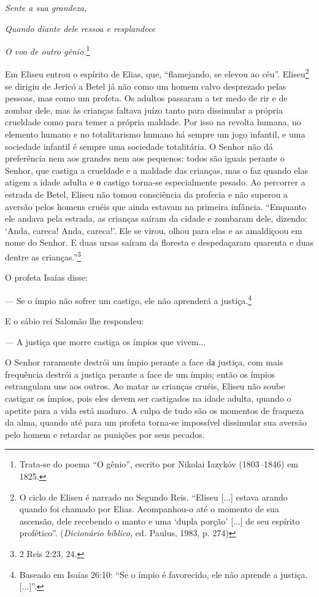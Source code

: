 \emph{Sente a sua grandeza,}

\emph{Quando diante dele ressoa e resplandece}

\emph{O voo de outro gênio.}\footnote{Trata-se do poema ``O gênio'',
  escrito por Nikolai Iazykóv (1803\emph{--}1846) em 1825.}

Em Eliseu entrou o espírito de Elias, que, ``flamejando, se elevou ao
céu''. Eliseu\footnote{O ciclo de Eliseu é narrado no Segundo Reis.
  ``Eliseu {[}...{]} estava arando quando foi chamado por Elias.
  Acompanhou-o até o momento de sua ascensão, dele recebendo o manto e
  uma `dupla porção' {[}...{]} de seu espírito profético''.
  (\emph{Dicionário bíblico,} ed\emph{.} Paulus, 1983, p. 274)} se
dirigiu de Jericó a Betel já não como um homem calvo desprezado pelas
pessoas, mas como um profeta. Os adultos passaram a ter medo de rir e de
zombar dele, mas às crianças faltava juízo tanto para dissimular a
própria crueldade como para temer a própria maldade. Por isso na revolta
humana, no elemento humano e no totalitarismo humano há sempre um jogo
infantil, e uma sociedade infantil é sempre uma sociedade totalitária. O
Senhor não dá preferência nem aos grandes nem aos pequenos: todos são
iguais perante o Senhor, que castiga a crueldade e a maldade das
crianças, mas o faz quando elas atigem a idade adulta e о castigo
torna-se especialmente pesado. Ao percorrer a estrada de Betel, Eliseu
não tomou consciência da profecia e não superou a aversão pelos homens
cruéis que ainda estavam na primeira infância. ``Enquanto ele andava
pela estrada, as crianças saíram da cidade e zombaram dele, dizendo:
`Anda, careca! Anda, careca!'. Ele se virou, olhou para elas e as
amaldiçoou em nome do Senhor. E duas ursas saíram da floresta e
despedaçaram quarenta e duas dentre as crianças.''\footnote{2 Reis 2:23,
  24.}

O profeta Isaías disse:

--- Se o ímpio não sofrer um castigo, ele não aprenderá a
justiça.\footnote{Baseado em Isaías 26:10: ``Se o ímpio é favorecido,
  ele não aprende a justiça. {[}...{]}''.}

E o sábio rei Salomão lhe respondeu:

--- A justiça que morre castiga os ímpios que vivem...

O Senhor raramente destrói um ímpio perante a face dа justiça, com mais
frequência destrói a justiça perante a face de um ímpio; então os ímpios
estrangulam uns aos outros. Ao matar as crianças cruéis, Eliseu não
soube castigar os ímpios, pois eles devem ser castigados na idade
adulta, quando o apetite para a vida está maduro. A culpa de tudo são os
momentos de fraqueza da alma, quando até para um profeta torna-se
impossível dissimular sua aversão pelo homem e retardar as punições por
seus pecados.

